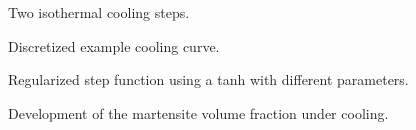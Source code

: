 \documentclass{article}%
\begin{document}
\begin{figure}[h]
\centering
{} %
\caption{Two isothermal cooling steps.}
\label{fig:ficTime}
\end{figure}

\begin{figure}[h]
\centering
{} 
\caption{Discretized example cooling curve.}
\label{fig:discTt}
\end{figure}

\begin{figure}[h]
\centering
{} %
\caption{}
\label{fig:}
\end{figure}


\begin{figure}[h]
\centering
{} %
\caption{Regularized step function using a tanh with different parameters.}
\label{fig:tanHPara}
\end{figure}

\begin{figure}[h]%
\centering
{} 
\caption{Development of the martensite volume fraction under cooling.}
\label{fig:MartDevelop}
\end{figure}
\end{document}
